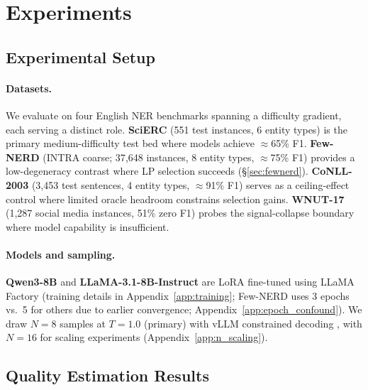 \section{Experiments}
\label{sec:experiments}

\subsection{Experimental Setup}
\label{sec:setup}

\paragraph{Datasets.}
We evaluate on four English NER benchmarks spanning a difficulty gradient, each serving a distinct role.
\textbf{SciERC} \cite{luan2018scierc} (551 test instances, 6 entity types) is the primary medium-difficulty test bed where models achieve ${\approx}$65\% F1.
\textbf{Few-NERD} \cite{ding2021fewnerd} (INTRA coarse; 37{,}648 instances, 8 entity types, ${\approx}$75\% F1) provides a low-degeneracy contrast where LP selection succeeds (\S\ref{sec:fewnerd}).
\textbf{CoNLL-2003} \cite{tjongkimsang2003conll} (3{,}453 test sentences, 4 entity types, ${\approx}$91\% F1) serves as a ceiling-effect control where limited oracle headroom constrains selection gains.
\textbf{WNUT-17} \cite{derczynski2017wnut} (1{,}287 social media instances, 51\% zero F1) probes the signal-collapse boundary where model capability is insufficient.

\paragraph{Models and sampling.}
\textbf{Qwen3-8B} and \textbf{LLaMA-3.1-8B-Instruct} are LoRA fine-tuned using LLaMA Factory \cite{zheng2024llamafactory} (training details in Appendix~\ref{app:training}; Few-NERD uses 3 epochs vs.\ 5 for others due to earlier convergence; Appendix~\ref{app:epoch_confound}).
We draw $N{=}8$ samples at $T{=}1.0$ (primary) with vLLM constrained decoding \cite{willard2023guided}, with $N{=}16$ for scaling experiments (Appendix~\ref{app:n_scaling}).

\subsection{Quality Estimation Results}
\label{sec:qe_results}

